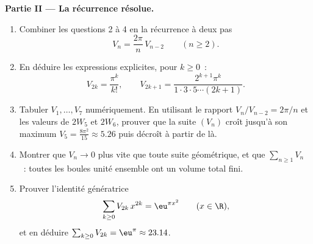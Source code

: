 \begin{problem}[{Problème du week-end --- $V_n =
\pi^{n/2}/\Gamma(\frac n2 + 1)$, et l'étrangeté des grandes
dimensions}]
\medskip
\noindent\textbf{Partie II --- La récurrence résolue.}
\begin{enumerate}[resume]
  \item Combiner les questions 2 à 4 en la récurrence à deux pas
        \[
        V_n = \frac{2\pi}{n}\,V_{n-2}
        \qquad (n \geq 2).
        \]
  \item En déduire les expressions explicites, pour $k \geq 0$~:
        \[
        V_{2k} = \frac{\pi^k}{k!},
        \qquad
        V_{2k+1} = \frac{2^{k+1}\pi^k}{1\cdot3\cdot5\cdots
        (2k+1)} .
        \]
  \item Tabuler $V_1, \dots, V_7$ numériquement. En utilisant le
        rapport $V_n/V_{n-2} = 2\pi/n$ et les valeurs de $2W_5$
        et $2W_6$, prouver que la suite $(V_n)$ croît
        jusqu'à son maximum $V_5 = \frac{8\pi^2}{15} \approx
        5.26$ puis décroît à partir de là.
  \item Montrer que $V_n \to 0$ plus vite que toute suite géométrique,
        et que $\sum_{n\geq1} V_n$ ~: toutes
        les boules unité ensemble ont un volume total fini.
  \item Prouver l'identité génératrice
        \[
        \sum_{k\geq0} V_{2k}\,x^{2k} = \eu^{\pi x^2}
        \qquad (x \in \R),
        \]
        et en déduire $\sum_{k\geq0}V_{2k} = \eu^\pi \approx
        23.14$.
\end{enumerate}


\end{problem}
